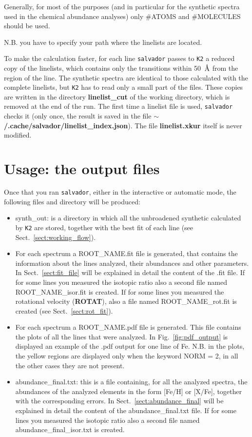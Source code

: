 \documentclass[modern]{aastex701}
\newcommand{\angstrom}{\mbox{\normalfont\AA}}
\begin{document}
Generally, for most of the purposes (and in particular for the synthetic spectra used in the chemical abundance analyses) only \#ATOMS and \#MOLECULES should be used. 

N.B. you have to specify your path where the linelists are located.

To make the calculation faster, for each line \texttt{salvador} passes to \texttt{K2} a reduced copy of the linelists, which contains only the transitions within 50~$\angstrom$ from the region of the line. The synthetic spectra are identical to those calculated with the complete linelists, but \texttt{K2} has to read only a small part of the files. These copies are written in the directory {\bf linelist\_cut} of the working directory, which is removed at the end of the run. The first time a linelist file is used, \texttt{salvador} checks it (only once, the result is saved in the file {\bf $\sim$/.cache/salvador/linelist\_index.json}). The file {\bf linelist.xkur} itself is never modified. 


\section{Usage: the output files} \label{sect:output_files}
\hrulefill

Once that you ran \texttt{salvador}, either in the interactive or automatic mode, the following files and directory will be produced:
\begin{itemize}
    \item synth\_out: is a directory in which all the unbroadened synthetic calculated by \texttt{K2} are stored, together with the best fit of each line (see Sect.~\ref{sect:working_flow}). 
    \item For each spectrum a ROOT\_NAME.fit file is generated, that contains the information about the lines analyzed, their abundances and other parameters. In Sect.~\ref{sect:fit_file} will be explained in detail the content of the .fit file. If for some lines you measured the isotopic ratio also a second file named ROOT\_NAME\_isor.fit is created. If for some lines you measured the rotational velocity ({\bf ROTAT}), also a file named ROOT\_NAME\_rot.fit is created (see Sect.~\ref{sect:rot_fit}). 
    \item For each spectrum a ROOT\_NAME.pdf file is generated. This file contains the plots of all the lines that were analyzed. In Fig.~\ref{fig:pdf_output} is displayed an example of the .pdf output for one line of Fe. N.B. in the plots, the yellow regions are displayed only when the keyword NORM = 2, in all the other cases they are not present.
    \item abundance\_final.txt: this is a file containing, for all the analyzed spectra, the abundances of the analyzed elements in the form [Fe/H] or [X/Fe], together with the corresponding errors. In Sect.~\ref{sect:abundance_final} will be explained in detail the content of the abundance\_final.txt file. If for some lines you measured the isotopic ratio also a second file named abundance\_final\_isor.txt is created. 
\end{itemize}
\end{document}
